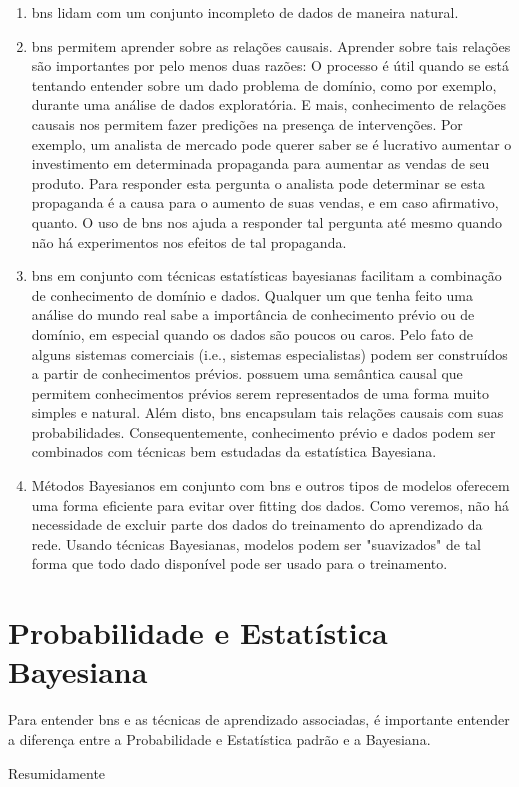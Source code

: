 \begin{enumerate}
	\item \glspl{bn} lidam com um conjunto incompleto de dados de maneira natural.

	\item \glspl{bn} permitem aprender sobre as relações causais. Aprender sobre tais relações são importantes por pelo menos duas razões: O processo é útil quando se está tentando entender sobre um dado problema de domínio, como por exemplo, durante uma análise de dados exploratória.  E mais, conhecimento de relações causais nos permitem fazer predições na presença de intervenções. Por exemplo, um analista de mercado pode querer saber se é lucrativo aumentar o investimento em determinada propaganda para aumentar as vendas de seu produto. Para responder esta pergunta o analista pode determinar se esta propaganda é a causa para o aumento de suas vendas, e em caso afirmativo, quanto. O uso de \glspl{bn} nos ajuda a responder tal pergunta até mesmo quando não há experimentos nos efeitos de tal propaganda.
	
	\item \glspl{bn} em conjunto com técnicas estatísticas bayesianas facilitam a combinação de conhecimento de domínio e dados. Qualquer um que tenha feito uma análise do mundo real sabe a importância de conhecimento prévio ou de domínio, em especial quando os dados são poucos ou caros. Pelo fato de alguns sistemas comerciais (i.e., sistemas especialistas) podem ser construídos a partir de conhecimentos prévios.  possuem uma semântica causal que permitem conhecimentos prévios serem representados de uma forma muito simples e natural. Além disto, \glspl{bn} encapsulam tais relações causais com suas probabilidades. Consequentemente, conhecimento prévio e dados podem ser combinados com técnicas bem estudadas da estatística Bayesiana.
	
	\item Métodos Bayesianos em conjunto com \glspl{bn} e outros tipos de modelos oferecem uma forma eficiente para evitar over fitting dos dados. Como veremos, não há necessidade de excluir parte dos dados do treinamento do aprendizado da rede. Usando técnicas Bayesianas, modelos podem ser "suavizados" de tal forma que todo dado disponível pode ser usado para o treinamento.

\end{enumerate}

\section{Probabilidade e Estatística Bayesiana}
Para entender \glspl{bn} e as técnicas de aprendizado associadas, é importante entender a diferença entre a Probabilidade e Estatística padrão e a Bayesiana.

Resumidamente
